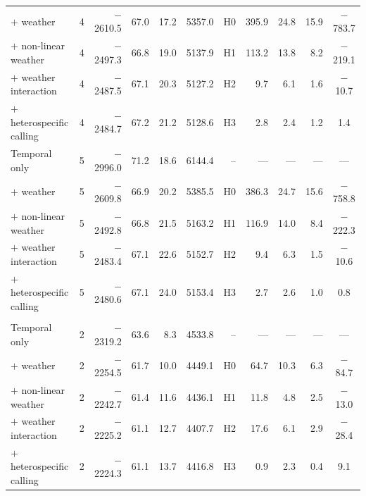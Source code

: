 \begin{table}[htbp]
\begin{tabular}{@{}l r rr r r rrr r c@{}}
\hspace{0.5em}$+$ weather & 4 & $-$2610.5 & 67.0 & 17.2 & 5357.0 & H0 & 395.9 & 24.8 & 15.9 & $-$783.7 \\
\hspace{0.5em}$+$ non-linear weather & 4 & $-$2497.3 & 66.8 & 19.0 & 5137.9 & H1 & 113.2 & 13.8 & 8.2 & $-$219.1 \\
\hspace{0.5em}$+$ weather interaction & 4 & $-$2487.5 & 67.1 & 20.3 & 5127.2 & H2 & 9.7 & 6.1 & 1.6 & $-$10.7 \\
\hspace{0.5em}$+$ heterospecific calling & 4 & $-$2484.7 & 67.2 & 21.2 & 5128.6 & H3 & 2.8 & 2.4 & 1.2 & 1.4 \\
\hspace{0.5em}Temporal only & 5 & $-$2996.0 & 71.2 & 18.6 & 6144.4 & -- & — & — & — & — \\
\hspace{0.5em}$+$ weather & 5 & $-$2609.8 & 66.9 & 20.2 & 5385.5 & H0 & 386.3 & 24.7 & 15.6 & $-$758.8 \\
\hspace{0.5em}$+$ non-linear weather & 5 & $-$2492.8 & 66.8 & 21.5 & 5163.2 & H1 & 116.9 & 14.0 & 8.4 & $-$222.3 \\
\hspace{0.5em}$+$ weather interaction & 5 & $-$2483.4 & 67.1 & 22.6 & 5152.7 & H2 & 9.4 & 6.3 & 1.5 & $-$10.6 \\
\hspace{0.5em}$+$ heterospecific calling & 5 & $-$2480.6 & 67.1 & 24.0 & 5153.4 & H3 & 2.7 & 2.6 & 1.0 & 0.8 \\
\addlinespace[3pt]
\multicolumn{11}{@{}l}{\textit{Oreobates berdemenos}}\\
\hspace{0.5em}Temporal only & 2 & $-$2319.2 & 63.6 & 8.3 & 4533.8 & -- & — & — & — & — \\
\hspace{0.5em}$+$ weather & 2 & $-$2254.5 & 61.7 & 10.0 & 4449.1 & H0 & 64.7 & 10.3 & 6.3 & $-$84.7 \\
\hspace{0.5em}$+$ non-linear weather & 2 & $-$2242.7 & 61.4 & 11.6 & 4436.1 & H1 & 11.8 & 4.8 & 2.5 & $-$13.0 \\
\hspace{0.5em}$+$ weather interaction & 2 & $-$2225.2 & 61.1 & 12.7 & 4407.7 & H2 & 17.6 & 6.1 & 2.9 & $-$28.4 \\
\hspace{0.5em}$+$ heterospecific calling & 2 & $-$2224.3 & 61.1 & 13.7 & 4416.8 & H3 & 0.9 & 2.3 & 0.4 & 9.1 \\

\end{tabular}
\end{table}
